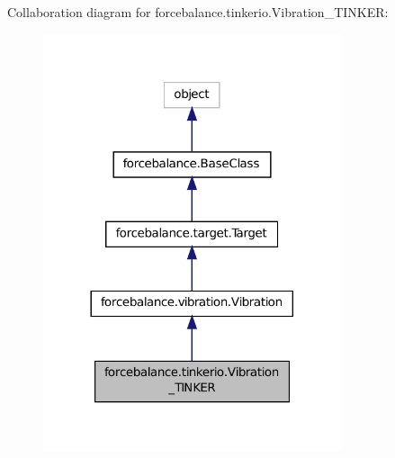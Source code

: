 Collaboration diagram for forcebalance.\-tinkerio.\-Vibration\-\_\-\-T\-I\-N\-K\-E\-R\-:
\nopagebreak
\begin{figure}[H]
\begin{center}
\leavevmode
\includegraphics[width=248pt]{classforcebalance_1_1tinkerio_1_1Vibration__TINKER__coll__graph}
\end{center}
\end{figure}
